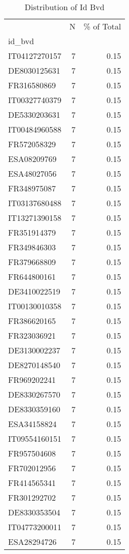 \begin{table*}[htbp]
\centering
\small
\caption{Distribution of Id Bvd}
\label{tab:dist_id_bvd}
\begin{tabular}{lrr}
\toprule
 & N & \% of Total \\
id_bvd &  &  \\
\midrule
IT04127270157 & 7 & 0.15 \\
DE8030125631 & 7 & 0.15 \\
FR316580869 & 7 & 0.15 \\
IT00327740379 & 7 & 0.15 \\
DE5330203631 & 7 & 0.15 \\
IT00484960588 & 7 & 0.15 \\
FR572058329 & 7 & 0.15 \\
ESA08209769 & 7 & 0.15 \\
ESA48027056 & 7 & 0.15 \\
FR348975087 & 7 & 0.15 \\
IT03137680488 & 7 & 0.15 \\
IT13271390158 & 7 & 0.15 \\
FR351914379 & 7 & 0.15 \\
FR349846303 & 7 & 0.15 \\
FR379668809 & 7 & 0.15 \\
FR644800161 & 7 & 0.15 \\
DE3410022519 & 7 & 0.15 \\
IT00130010358 & 7 & 0.15 \\
FR386620165 & 7 & 0.15 \\
FR323036921 & 7 & 0.15 \\
DE3130002237 & 7 & 0.15 \\
DE8270148540 & 7 & 0.15 \\
FR969202241 & 7 & 0.15 \\
DE8330267570 & 7 & 0.15 \\
DE8330359160 & 7 & 0.15 \\
ESA34158824 & 7 & 0.15 \\
IT09554160151 & 7 & 0.15 \\
FR957504608 & 7 & 0.15 \\
FR702012956 & 7 & 0.15 \\
FR414565341 & 7 & 0.15 \\
FR301292702 & 7 & 0.15 \\
DE8330353504 & 7 & 0.15 \\
IT04773200011 & 7 & 0.15 \\
ESA28294726 & 7 & 0.15 \\

\end{tabular}
\end{table*}
